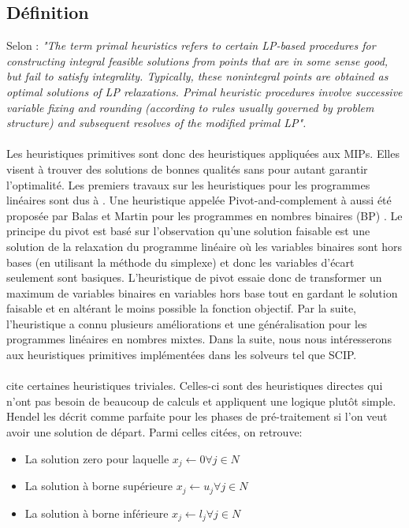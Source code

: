 \documentclass[12pt,a4paper,oneside]{book}
\theoremstyle{definition}
\begin{document}
	\subsection{Définition}
	Selon \cite{Lee2001}: \textit{"The term primal heuristics refers to certain LP-based procedures for constructing integral feasible solutions from points that are in some sense good, but fail to satisfy integrality. Typically, these nonintegral points are obtained as optimal solutions of LP relaxations. Primal heuristic procedures involve successive variable fixing and rounding (according to rules usually governed by problem structure) and subsequent resolves of the 			modified primal LP".}
	\paragraph{}
	Les heuristiques primitives sont donc des heuristiques appliquées aux MIPs. Elles visent à trouver des solutions de bonnes qualités sans pour autant garantir l’optimalité. Les premiers travaux sur les heuristiques pour les programmes linéaires sont dus à \cite{gomory1958}. Une heuristique appelée Pivot-and-complement à aussi été proposée par Balas et Martin pour les programmes en nombres binaires (BP) \cite{Balas1980}. Le principe du pivot est basé sur l’observation qu’une solution faisable est une solution de la relaxation du programme linéaire où les variables binaires sont hors bases (en utilisant la méthode du simplexe) et donc les variables d’écart seulement sont basiques. L’heuristique de pivot essaie donc de transformer un maximum de variables binaires en variables hors base tout en gardant le solution faisable et en altérant le moins possible la fonction objectif. Par la suite, l’heuristique a connu plusieurs améliorations et une généralisation pour les programmes linéaires en nombres mixtes. Dans la suite, nous nous intéresserons aux heuristiques primitives implémentées dans les solveurs tel que SCIP.
	
	\paragraph{}
	\cite{Hendel2011} cite certaines heuristiques triviales. Celles-ci sont des heuristiques directes qui n'ont pas besoin de beaucoup de calculs et appliquent une logique plutôt simple. Hendel les décrit comme parfaite pour les phases de pré-traitement si l'on veut avoir une solution de départ. Parmi celles citées, on retrouve:
	
	\begin{itemize}
		\item La solution zero pour laquelle $x_j \gets 0 \forall j \in N$
		\item La solution à borne supérieure $x_j \gets u_j \forall j \in N $
		\item La solution à borne inférieure $x_j \gets l_j \forall j \in N $
	\end{itemize}
\end{document}

